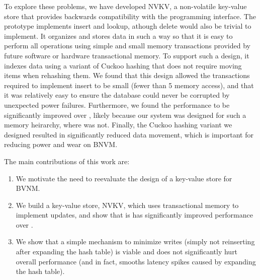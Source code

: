 To explore these problems, we have developed NVKV, a non-volatile key-value
store that provides backwards compatibility with the \bdb programming interface.
The prototype implements insert and lookup, athough delete would also be trivial
to implement. It organizes and stores data in such a way so that it is easy to
perform all operations using simple and small memory transactions provided by
future software or hardware transactional memory. To support such a design, it
indexes data using a variant of Cuckoo hashing that does not require moving
items when rehashing them. We found that this design allowed the transactions
required to implement insert to be small (fewer than 5 memory access), and that
it was relatively easy to ensure the database could never be corrupted by
unexpected power failures. Furthermore, we found the performance to be
significantly improved over \bdb, likely because our system was designed for
such a memory heirarchy, where \bdb was not. Finally, the Cuckoo hashing variant
we designed resulted in significantly reduced data movement, which is important
for reducing power and wear on BNVM.

The main contributions of this work are:

\begin{enumerate}

\item We motivate the need to reevaluate the design of a key-value store for
BVNM.
\item We build a key-value store, NVKV, which uses transactional
memory to implement updates, and show that is has significantly improved
performance over \bdb.
\item We show that a simple mechanism to minimize writes (simply not reinserting
after expanding the hash table) is viable and does not significantly hurt
overall performance (and in fact, smooths latency spikes caused by expanding the
hash table).
\end{enumerate}

